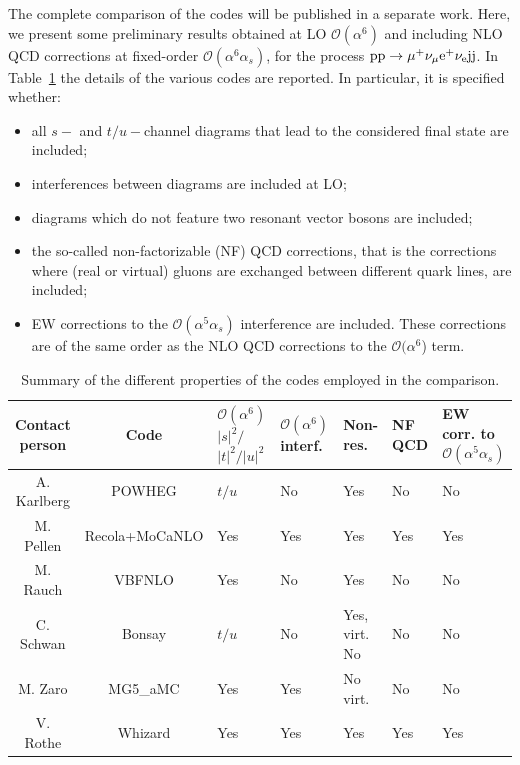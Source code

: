 The complete comparison of the codes will be published in a separate work. Here, we present some preliminary results obtained at LO $\mathcal O (\alpha^6)$ and including
NLO QCD corrections at fixed-order $\mathcal O (\alpha^6\alpha_s)$, for the process ${\rm p}{\rm p}\to\mu^+\nu_\mu{\rm e}^+\nu_{\rm e}{\rm j}{\rm j}$.
In Table~\ref{tab:wg1_codes} the details of the various codes are reported. In particular, it is specified whether:
\begin{itemize}
    \item all $s-$ and $t/u-$channel diagrams that lead to the considered final state are included;
    \item interferences between diagrams are included at LO;
    \item diagrams which do not feature two resonant vector bosons are included;
    \item the so-called non-factorizable (NF) QCD corrections, that is the corrections where (real or virtual) gluons are exchanged between different quark lines,
        are included;
    \item EW corrections to the $\mathcal O (\alpha^5\alpha_s)$ interference are included. These corrections are of the same order as the NLO QCD corrections to
        the  $\mathcal O (\alpha^6$) term.
\end{itemize}
%
\begin{table}
    \footnotesize
    \begin{tabularx}{\textwidth}{c|c|X|X|X|X|X}
        Contact person  &  Code  &  $\mathcal O(\alpha^6)$ $|s|^2/$ $|t|^2/|u|^2$  &  $\mathcal O(\alpha^6)$ interf.  &  Non-res.  &  NF QCD  &  EW corr. to $\mathcal O(\alpha^5\alpha_s)$  \\
        \hline
        \hline
        A. Karlberg  &  {\sc POWHEG}  &  $t/u$  &  No  &  Yes  &  No  &  No  \\
        M. Pellen    &  {\sc Recola+MoCaNLO}  &  Yes  &  Yes  &  Yes  &  Yes  &  Yes  \\
        M. Rauch     &  {\sc VBFNLO}  &  Yes  &  No  &  Yes  &  No  &  No  \\
        C. Schwan    &  {\sc Bonsay}  &  $t/u$  &  No  &  Yes, virt. No  &  No  &  No  \\
        M. Zaro      &  {\sc MG5\_aMC}  &  Yes  &  Yes  &  No virt.  &  No  &  No \\
        V. Rothe     &  {\sc Whizard}  &  Yes  &  Yes  &  Yes  &  Yes  &  Yes \\  
    \end{tabularx}
    \caption{\label{tab:wg1_codes} Summary of the different properties of the codes employed in the comparison.}
\end{table}
%

